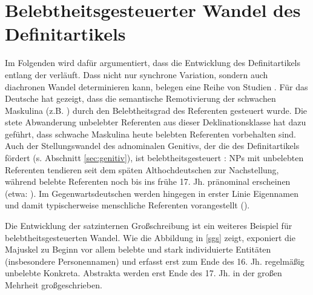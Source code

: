 \section{Belebtheitsgesteuerter Wandel des Definitartikels}\label{sec:belebtwandel}

Im Folgenden wird dafür argumentiert, dass die Entwicklung des Definitartikels  entlang der   verläuft. Dass  nicht nur synchrone Variation, sondern auch diachronen Wandel determinieren kann, belegen eine Reihe von Studien \parencite[vgl. die Übersicht in][]{Enger2011}. Für das Deutsche hat \textcite{Kopcke1995, Kopcke2000a,Kopcke2000,Kopcke2005} gezeigt, dass die semantische Remotivierung der schwachen Maskulina (z.B. )  durch den  Belebtheitsgrad   des Referenten gesteuert wurde. Die stete Abwanderung unbelebter  Referenten aus dieser Deklinationsklasse hat dazu geführt, dass schwache Maskulina  heute belebten  Referenten vorbehalten sind. 
Auch der Stellungswandel  des  adnominalen Genitivs, der die  des Definitartikels fördert (s. Abschnitt \ref{sec:genitiv}), ist belebtheitsgesteuert \parencite[215--223]{Demske2001}: NPs  mit unbelebten  Referenten tendieren seit dem späten Althochdeutschen zur Nachstellung, während belebte  Referenten noch bis ins frühe 17. Jh. pränominal  erscheinen (etwa: ). Im Gegenwartsdeutschen werden hingegen in erster Linie Eigennamen  und damit typischerweise menschliche Referenten vorangestellt  ().   

Die Entwicklung der satzinternen Großschreibung \parencite{Bergmann1998a,Bergmann1998,Bergmann1999,Szczepaniak2011,Szczepaniak2016} ist ein weiteres Beispiel für belebtheitsgesteuerten Wandel. Wie die Abbildung in \ref{sgs} zeigt, exponiert die Majuskel zu Beginn vor allem belebte  und stark individuierte  Entitäten (insbesondere Personennamen) und erfasst erst zum Ende des 16. Jh. regelmäßig unbelebte Konkreta. Abstrakta  werden erst Ende des 17. Jh. in der großen Mehrheit großgeschrieben.  

